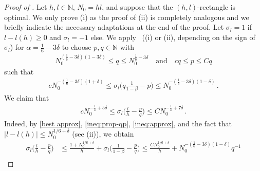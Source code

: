 \documentclass[reqno]{amsart}
\theoremstyle{plain}
\theoremstyle{definition}
\numberwithin{equation}{section}
\newcommand{\N}{\mathbb{N}}
\begin{document}
 
 


\begin{proof}[Proof of ] Let $h,l \in
  \mathbb{N}$, $N_0  =hl$, and suppose that the  $(h,l)$-rectangle is
  optimal. We only prove ({\rm i}) as the proof of ({\rm ii}) is
  completely analogous  and we  briefly indicate the necessary
   adaptations  at the end of the proof.   Let $\sigma_l = 1$ if $l- l(h)\ge 0$ and $\sigma_l = -1$ else.    We apply~ ((i) or (ii), depending on the sign of $\sigma_l$)  for $\alpha = \frac{1}{6}-3\delta$ to choose $p,q \in \N$ with
  \begin{align}\label{ineq:prop-qp}
  N_0^{(\frac{1}{6}-3\delta)(1-3\delta)} \leq q \leq N_0^{\frac{1}{6}-3\delta} \quad \text{and}\quad c
  q\leq p \leq C q 
  \end{align}
  such that
  \begin{align}\label{ineq:approx}
c N_0^{-(\frac{1}{6}-3\delta)(1+\delta)} \leq  \sigma_l  \Big( q \frac{1}{1-\beta}      - p \Big) \leq N_0^{-(\frac{1}{6}-3\delta)(1-\delta)}\,.
  \end{align} 
   We claim that
  \begin{align}\label{impi}
cN_0^{-\frac{1}{3}+ 5  \delta}\leq    \sigma_l   \Big( \frac{l}{h} - \frac{p}{q} \Big) \leq CN_0^{-\frac{1}{3} + 7  \delta}\,.
  \end{align}
Indeed, by \eqref{best approx},  \eqref{ineq:prop-qp}, \eqref{ineq:approx},  and the fact that $|l - l(h)| \le N_0^{1/6+\delta}$ (see (ii)), we obtain
\begin{align*}
  \sigma_l   \Big( \frac{l}{h} - \frac{p}{q} \Big) & \le \frac{1+N_0^{1/6+\delta}}{h} +  \sigma_l   \Big( \frac{1}{1-\beta}     - \frac{p}{q}  \Big) \le \frac{CN_0^{1/6+\delta}}{h} +   N_0^{-(\frac{1}{6}-3\delta)(1-\delta)} q^{-1} \\

\end{align*}
\end{proof}
\end{document}
